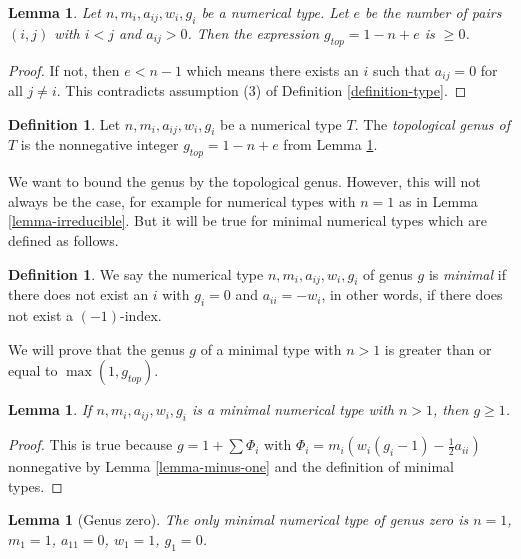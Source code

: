\documentclass[10pt,a4paper]{amsart}
\theoremstyle{plain}
\newtheorem{lemma}[subsection]{Lemma}
\theoremstyle{definition}
\newtheorem{definition}[subsection]{Definition}
\theoremstyle{remark}
\numberwithin{equation}{subsection}
\begin{document}
\begin{lemma}
\label{lemma-top-genus}
Let $n, m_i, a_{ij}, w_i, g_i$ be a numerical type.
Let $e$ be the number of pairs $(i, j)$ with $i < j$ and $a_{ij} > 0$.
Then the expression $g_{top} = 1 - n + e$ is $\geq 0$.
\end{lemma}

\begin{proof}
If not, then $e < n - 1$ which means there exists an $i$ such that
$a_{ij} = 0$ for all $j \not = i$. This contradicts assumption
(3) of Definition \ref{definition-type}.
\end{proof}

\begin{definition}
\label{definition-top-genus}
Let $n, m_i, a_{ij}, w_i, g_i$ be a numerical type $T$. The
{\it topological genus of $T$} is the nonnegative integer
$g_{top} = 1 - n + e$ from Lemma \ref{lemma-top-genus}.
\end{definition}

\noindent
We want to bound the genus by the topological genus. However, this
will not always be the case, for example for numerical types
with $n = 1$ as in Lemma \ref{lemma-irreducible}. But it will
be true for minimal numerical types which are defined as follows.

\begin{definition}
\label{definition-type-minimal}
We say the numerical type $n, m_i, a_{ij}, w_i, g_i$ of genus $g$
is {\it minimal} if there does not exist an $i$
with $g_i = 0$ and $a_{ii} = -w_i$, in other words, if there
does not exist a $(-1)$-index.
\end{definition}

\noindent
We will prove that the genus $g$ of a minimal type with $n > 1$
is greater than or equal to $\max(1, g_{top})$.

\begin{lemma}
\label{lemma-non-irreducible-minimal-type-genus-at-least-one}
If $n, m_i, a_{ij}, w_i, g_i$ is a minimal numerical type
with $n > 1$, then $g \geq 1$.
\end{lemma}

\begin{proof}
This is true because $g = 1 + \sum \Phi_i$ with
$\Phi_i = m_i(w_i(g_i - 1) - \frac{1}{2} a_{ii})$ nonnegative
by Lemma \ref{lemma-minus-one} and the definition of minimal types.
\end{proof}

\begin{lemma}[Genus zero]
\label{lemma-genus-zero}
The only minimal numerical type of genus zero is
$n = 1$, $m_1 = 1$, $a_{11} = 0$, $w_1 = 1$, $g_1 = 0$.
\end{lemma}
\end{document}
